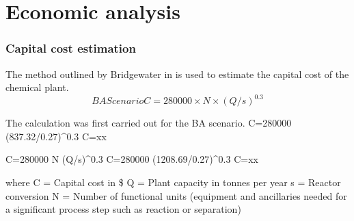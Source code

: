 
\section{Economic analysis}
\label{app:economics}
\subsubsection{Capital cost estimation}

The method outlined by Bridgewater in is used to estimate the capital cost of the chemical plant.
\begin{equation}
    BA Scenario
    C=280000 \times N \times (Q/s)^0.3
\end{equation}

The calculation was first carried out for the BA scenario.
    C=280000  \times (837.32/0.27)^0.3
    C=xx
 
    C=280000 \times N \times (Q/s)^0.3
    C=280000  \times (1208.69/0.27)^0.3
    C=xx

where C = Capital cost in \$
Q = Plant capacity in tonnes per year
s = Reactor conversion
N = Number of functional units (equipment and ancillaries needed for a significant process step such as reaction or separation)